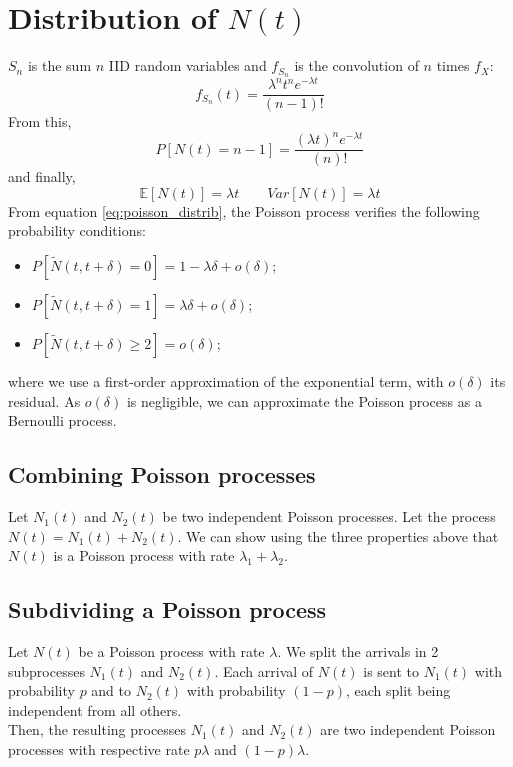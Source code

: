\documentclass[12pt, openany]{report}
\newcommand{\E}{\mathbb{E}}
\theoremstyle{definition}
\begin{document}
\section{\texorpdfstring{Distribution of $N(t)$}{Distribution of }}
$S_n$ is the sum $n$ IID random variables and $f_{S_n}$ is the convolution of $n$ times $f_X$:
\begin{equation}
  f_{S_n}(t) = \frac{\lambda^n t^{n}e^{-\lambda t}}{(n-1)!}
\end{equation}
From this, 
\begin{equation}\label{eq:poisson_distrib}
  P[N(t)=n-1] = \frac{(\lambda t)^{n}e^{-\lambda t}}{(n)!}
\end{equation}
and finally, 
\begin{equation}
  \E[N(t)] = \lambda t\qquad Var[N(t)] = \lambda t
\end{equation}
From equation \eqref{eq:poisson_distrib}, the Poisson process verifies the following probability conditions:
\begin{itemize}
  \item $P[\tilde N(t,t+\delta)=0]=1-\lambda \delta +o(\delta)$;
  \item $P[\tilde N(t,t+\delta)=1]=\lambda \delta +o(\delta)$;
  \item $P[\tilde N(t,t+\delta)\ge2]=o(\delta)$;
\end{itemize}
where we use a first-order approximation of the exponential term, with $o(\delta)$ its residual. As $o(\delta)$ is negligible, we can approximate the Poisson process as a Bernoulli process. 
\subsection{Combining Poisson processes}
Let $N_1(t)$ and $N_2(t)$ be two independent Poisson processes. Let the process $N(t)=N_1(t)+N_2(t)$. We can show using the three properties above that $N(t)$ is a Poisson process with rate $\lambda_1+\lambda_2$.
\subsection{Subdividing a Poisson process}
Let $N(t)$ be a Poisson process with rate $\lambda$. We split the arrivals in 2 subprocesses $N_1(t)$ and $N_2(t)$. Each arrival of $N(t)$ is sent to $N_1(t)$ with probability $p$ and to $N_2(t)$ with probability $(1-p)$, each split being independent from all others. \\
Then, the resulting processes $N_1(t)$ and $N_2(t)$ are two independent Poisson processes with respective rate $p\lambda$ and $(1-p)\lambda$.
\end{document}
